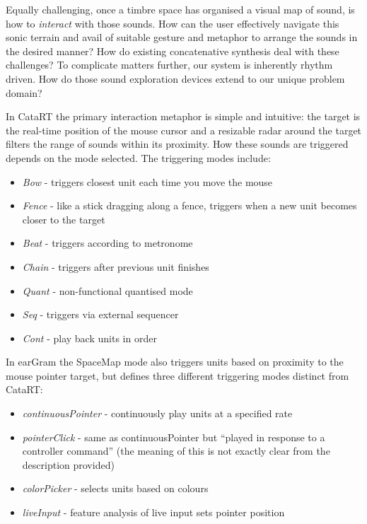 Equally challenging, once a timbre space has organised a visual map of sound, is how to \textit{interact} with those sounds. How can the user effectively navigate this sonic terrain and avail of suitable gesture and metaphor to arrange the sounds in the desired manner? How do existing concatenative synthesis deal with these challenges? To complicate matters further, our system is inherently rhythm driven. How do those sound exploration devices extend to our unique problem domain?

In CataRT the primary interaction metaphor is simple and intuitive: the target is the real-time position of the mouse cursor and a resizable radar around the target filters the range of sounds within its proximity. How these sounds are triggered depends on the mode selected. The triggering modes include:

\begin{itemize}
  \item \textit{Bow} - triggers closest unit each time you move the mouse
  \item \textit{Fence} - like a stick dragging along a fence, triggers when a new unit becomes closer to the target
  \item \textit{Beat} - triggers according to metronome
  \item \textit{Chain} - triggers after previous unit finishes
  \item \textit{Quant} - non-functional quantised mode
  \item \textit{Seq} - triggers via external sequencer
  \item \textit{Cont} - play back units in order
\end{itemize}

In earGram the SpaceMap mode also triggers units based on proximity to the mouse pointer target, but defines three different triggering modes distinct from CataRT:

 \begin{itemize}
  \item \textit{continuousPointer} - continuously play units at a specified rate
  \item \textit{pointerClick} - same as continuousPointer but ``played in response to a controller command'' (the meaning of this is not exactly clear from the description provided)
  \item \textit{colorPicker} - selects units based on colours
  \item \textit{liveInput} - feature analysis of live input sets pointer position
\end{itemize} 

